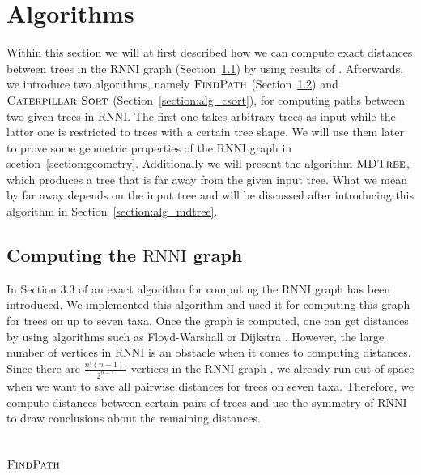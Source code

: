 \documentclass{amsart}
\newcommand{\rnni}{\mathrm{RNNI}}
\newcommand{\csort}{\textsc{Caterpillar Sort}}
\newcommand{\findpath}{\textsc{FindPath}}
\newcommand{\mdtree}{\textsc{MDTree}}
\begin{document}


\section{Algorithms}
\label{section:algorithms}

Within this section we will at first described how we can compute exact distances between trees in the $\rnni$ graph (Section~\ref{section:alg_RNNI_graph}) by using results of \autocite{Gavryushkin2018-ol}.
Afterwards, we introduce two algorithms, namely $\findpath$ (Section~\ref{section:alg_findpath}) and $\csort$ (Section~\ref{section:alg_csort}), for computing paths between two given trees in $\rnni$.
The first one takes arbitrary trees as input while the latter one is restricted to trees with a certain tree shape.
We will use them later to prove some geometric properties of the $\rnni$ graph in section~\ref{section:geometry}.
Additionally we will present the algorithm $\mdtree$, which produces a tree that is far away from the given input tree.
What we mean by far away depends on the input tree and will be discussed after introducing this algorithm in Section~\ref{section:alg_mdtree}.

\subsection{Computing the $\rnni$ graph}
\label{section:alg_RNNI_graph}

In Section 3.3 of \autocite{Gavryushkin2018-ol} an exact algorithm for computing the $\rnni$ graph has been introduced.
We implemented this algorithm and used it for computing this graph for trees on up to seven taxa.
Once the graph is computed, one can get distances by using algorithms such as Floyd-Warshall \autocite{Floyd1962-ew} or Dijkstra \autocite{Dijkstra1959-ph}.
However, the large number of vertices in $\rnni$ is an obstacle when it comes to computing distances.
Since there are $\frac{n!(n-1)!}{2^{n-1}}$ vertices in the $\rnni$ graph \autocite{Gavryushkin2018-ol}, we already run out of space when we want to save all pairwise distances for trees on seven taxa.
Therefore, we compute distances between certain pairs of trees and use the symmetry of $\rnni$ to draw conclusions about the remaining distances.


\subsection{$\findpath$}
\label{section:alg_findpath}
\end{document}
